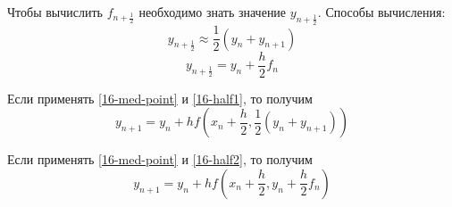 Чтобы вычислить $f_{n + \frac{1}{2}}$ необходимо знать значение
$y_{n + \frac{1}{2}}$. Способы вычисления:
\begin{equation}
  \label{16-half1}
  y_{n + \frac{1}{2}} \approx \frac{1}{2}(y_n + y_{n + 1})
\end{equation}
\begin{equation}
  \label{16-half2}
  y_{n + \frac{1}{2}} = y_n + \frac{h}{2}f_n
\end{equation}

Если применять \eqref{16-med-point} и \eqref{16-half1}, то получим
\begin{equation}
  y_{n + 1} = y_n + hf\left(x_n + \frac{h}{2}, \frac{1}{2}(y_n + y_{n + 1})
  \right)
\end{equation}

Если применять \eqref{16-med-point} и \eqref{16-half2}, то получим
\begin{equation}
  y_{n + 1} = y_n + hf\left(x_n + \frac{h}{2}, y_n + \frac{h}{2}f_n\right)
\end{equation}
